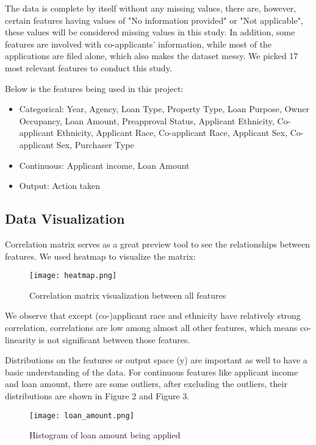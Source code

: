 \documentclass[letterpaper, 10 pt, conference]{ieeeconf}  %
\begin{document}
The data is complete by itself without any missing values, there are, however, certain features having values of "No information provided" or "Not applicable", these values will be considered missing values in this study. In addition, some features are involved with co-applicants' information, while most of the applications are filed alone, which also makes the dataset messy. We picked 17 most relevant features to conduct this study.

Below is the features being used in this project:
\begin{itemize}

\item Categorical: Year, Agency, Loan Type, Property Type, Loan Purpose, Owner Occupancy, Loan Amount, Preapproval Status, Applicant Ethnicity, Co-applicant Ethnicity, Applicant Race, Co-applicant Race, Applicant Sex, Co-applicant Sex, Purchaser Type
\item Continuous: Applicant income, Loan Amount
\item Output: Action taken

\end{itemize}
\subsection{Data Visualization}
Correlation matrix serves as a great preview tool to see the relationships between features. We used heatmap to visualize the matrix:
\begin{figure}[h]
    \centering
    \texttt{[image: heatmap.png]}
    \caption{Correlation matrix visualization between all features}
    \label{fig:mesh2}
\end{figure}

We observe that except (co-)applicant race and ethnicity have relatively strong correlation, correlations are low among almost all other features, which means co-linearity is not significant between those features. 

Distributions on the features or output space (y) are important as well to have a basic understanding of the data. For continuous features like applicant income and loan amount, there are some outliers, after excluding the outliers, their distributions are shown in Figure 2 and Figure 3. 

\begin{figure}[H]
    \centering
    \texttt{[image: loan\_amount.png]}
    \caption{Histogram of loan amount being applied}
\end{figure}
\end{document}
